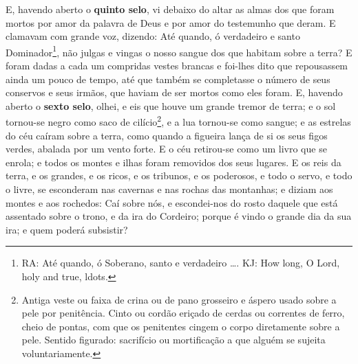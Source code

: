 E, havendo aberto o \textbf{quinto selo}, vi debaixo do altar as
almas dos que foram mortos por amor da palavra de Deus e por amor do
testemunho que deram. E clamavam com grande voz, dizendo: Até
quando, ó verdadeiro e santo Dominador\footnote{RA: Até quando, ó
Soberano, santo e verdadeiro \ldots{}. KJ: How long, O Lord, holy
and true, ldots{}.}, não julgas e vingas o nosso sangue dos que
habitam sobre a terra? E foram dadas a cada um compridas
vestes brancas e foi-lhes dito que repousassem ainda um pouco de
tempo, até que também se completasse o número de seus conservos e
seus irmãos, que haviam de ser mortos como eles foram. E,
havendo aberto o \textbf{sexto selo}, olhei, e eis que houve um
grande tremor de terra; e o sol tornou-se negro como saco de
cilício\footnote{Antiga veste ou faixa de crina ou de pano grosseiro
e áspero usado sobre a pele por penitência. Cinto ou cordão eriçado
de cerdas ou correntes de ferro, cheio de pontas, com que os
penitentes cingem o corpo diretamente sobre a pele. Sentido
figurado: sacrifício ou mortificação a que alguém se sujeita
voluntariamente.}, e a lua tornou-se como sangue; e as
estrelas do céu caíram sobre a terra, como quando a figueira lança
de si os seus figos verdes, abalada por um vento forte. E o
céu retirou-se como um livro que se enrola; e todos os montes e
ilhas foram removidos dos seus lugares. E os reis da terra, e
os grandes, e os ricos, e os tribunos, e os poderosos, e todo o
servo, e todo o livre, se esconderam nas cavernas e nas rochas das
montanhas; e diziam aos montes e aos rochedos: Caí sobre nós,
e escondei-nos do rosto daquele que está assentado sobre o trono, e
da ira do Cordeiro; porque é vindo o grande dia da sua ira; e
quem poderá subsistir?

\medskip

